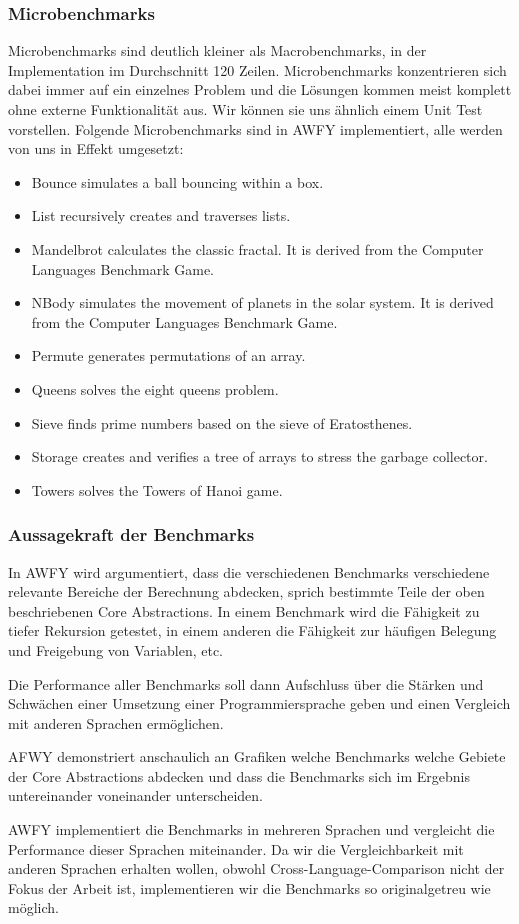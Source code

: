 \subsubsection{Microbenchmarks}
Microbenchmarks sind deutlich kleiner als Macrobenchmarks, in der Implementation im Durchschnitt 120 Zeilen. %
Microbenchmarks konzentrieren sich dabei immer auf ein einzelnes Problem und die Lösungen kommen meist komplett ohne externe Funktionalität aus. Wir können sie uns ähnlich einem Unit Test vorstellen.
Folgende Microbenchmarks sind in AWFY implementiert, alle werden von uns in Effekt umgesetzt:
\begin{itemize}
    \item Bounce simulates a ball bouncing within a box.
    \item List recursively creates and traverses lists.
    \item Mandelbrot calculates the classic fractal. It is derived from the Computer Languages Benchmark Game.
    \item NBody simulates the movement of planets in the solar system. It is derived from the Computer Languages Benchmark Game.
    \item Permute generates permutations of an array.
    \item Queens solves the eight queens problem.
    \item Sieve finds prime numbers based on the sieve of Eratosthenes.
    \item Storage creates and verifies a tree of arrays to stress the garbage collector.
    \item Towers solves the Towers of Hanoi game.
\end{itemize}\cite[readme.md]{awfyGithub}

\subsubsection{Aussagekraft der Benchmarks}
In AWFY wird argumentiert, dass die verschiedenen Benchmarks verschiedene relevante Bereiche der Berechnung abdecken, sprich bestimmte Teile der oben beschriebenen Core Abstractions.
In einem Benchmark wird die Fähigkeit zu tiefer Rekursion getestet, in einem anderen die Fähigkeit zur häufigen Belegung und Freigebung von Variablen, etc.

Die Performance aller Benchmarks soll dann Aufschluss über die Stärken und Schwächen einer Umsetzung einer Programmiersprache geben und einen Vergleich mit anderen Sprachen ermöglichen.

AFWY demonstriert anschaulich an Grafiken welche Benchmarks welche Gebiete der Core Abstractions abdecken und dass die Benchmarks sich im Ergebnis untereinander voneinander unterscheiden.\cite[Kapitel 4.2, Results]{awfyPaper}

AWFY implementiert die Benchmarks in mehreren Sprachen und vergleicht die Performance dieser Sprachen miteinander. Da wir die Vergleichbarkeit mit anderen Sprachen erhalten wollen, obwohl Cross-Language-Comparison nicht der Fokus der Arbeit ist, implementieren wir die Benchmarks so originalgetreu wie möglich. 
